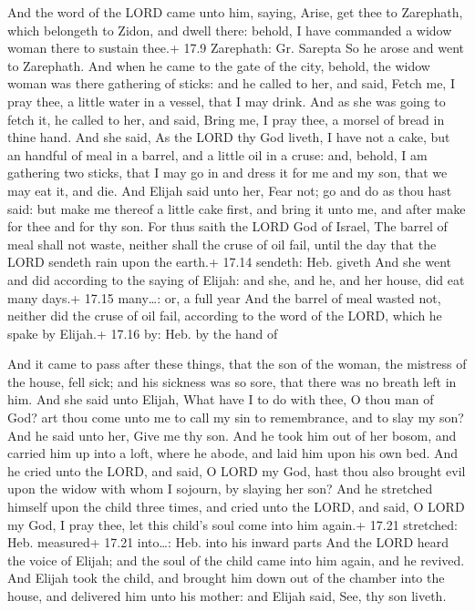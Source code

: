  And the word of the LORD came unto him, saying,
 Arise, get thee to Zarephath, which belongeth to Zidon, and
dwell there: behold, I have commanded a widow woman there to sustain
thee.+ 17.9 Zarephath: Gr. Sarepta  So he arose and went to
Zarephath. And when he came to the gate of the city, behold, the widow
woman was there gathering of sticks: and he called to her, and said,
Fetch me, I pray thee, a little water in a vessel, that I may drink.
 And as she was going to fetch it, he called to her, and
said, Bring me, I pray thee, a morsel of bread in thine hand.
 And she said, As the LORD thy God liveth, I have not a
cake, but an handful of meal in a barrel, and a little oil in a cruse:
and, behold, I am gathering two sticks, that I may go in and dress it
for me and my son, that we may eat it, and die.  And Elijah
said unto her, Fear not; go and do as thou hast said: but make me
thereof a little cake first, and bring it unto me, and after make for
thee and for thy son.  For thus saith the LORD God of
Israel, The barrel of meal shall not waste, neither shall the cruse of
oil fail, until the day that the LORD sendeth rain upon the earth.+
17.14 sendeth: Heb. giveth  And she went and did according
to the saying of Elijah: and she, and he, and her house, did eat many
days.+ 17.15 many\ldots: or, a full year  And the barrel of
meal wasted not, neither did the cruse of oil fail, according to the
word of the LORD, which he spake by Elijah.+ 17.16 by: Heb. by the hand
of

 And it came to pass after these things, that the son of
the woman, the mistress of the house, fell sick; and his sickness was so
sore, that there was no breath left in him.  And she said
unto Elijah, What have I to do with thee, O thou man of God? art thou
come unto me to call my sin to remembrance, and to slay my son?
 And he said unto her, Give me thy son. And he took him out
of her bosom, and carried him up into a loft, where he abode, and laid
him upon his own bed.  And he cried unto the LORD, and
said, O LORD my God, hast thou also brought evil upon the widow with
whom I sojourn, by slaying her son?  And he stretched
himself upon the child three times, and cried unto the LORD, and said, O
LORD my God, I pray thee, let this child's soul come into him again.+
17.21 stretched: Heb. measured+ 17.21 into\ldots: Heb. into his inward
parts  And the LORD heard the voice of Elijah; and the soul
of the child came into him again, and he revived.  And
Elijah took the child, and brought him down out of the chamber into the
house, and delivered him unto his mother: and Elijah said, See, thy son
liveth.

